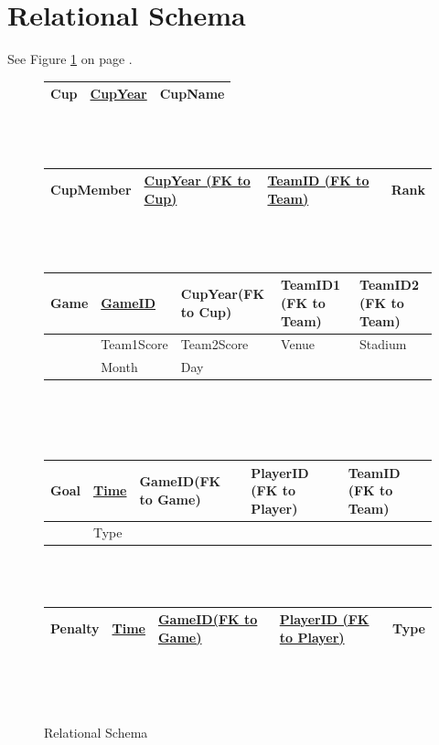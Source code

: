 \documentclass{article}
\begin{document}
\section{Relational Schema}
See Figure \ref{schematable} on page \pageref{schematable}.
\begin{figure}
	\caption{Relational Schema}
	\label{schematable}
	\begin{tabular}{||l || l | l |}
		\hline
		Cup & \textbf{\underline{CupYear}} & CupName \\
		\hline
	\end{tabular}
	\\
	\\
	\begin{tabular}{||l || l | l | l |}
		\hline
		CupMember & \textbf{\underline{CupYear (FK to Cup)}} & \textbf{\underline{TeamID (FK to Team)}} & Rank\\
		\hline
	\end{tabular}
	\\
	\\
	\begin{tabular}{||l || l | l | l |l|}
		\hline
		Game & \textbf{\underline{GameID}} & CupYear(FK to Cup) & TeamID1 (FK to Team) & TeamID2 (FK to Team)\\
		\hline
		& Team1Score & Team2Score & Venue & Stadium \\
		\hline
		& Month & Day & &\\
		\hline
	\end{tabular}
	\\
	\\
	\\
	\begin{tabular}{||l || l | l | l |l|}
		\hline
		Goal & \textbf{\underline{Time}} & GameID(FK to Game) & PlayerID (FK to Player) & TeamID (FK to Team)\\
		\hline
		& Type & & & \\
		\hline
	\end{tabular}
	\\
	\\
	\begin{tabular}{||l || l | l | l |l|}
		\hline
		Penalty & \textbf{\underline{Time}} & \textbf{\underline{GameID(FK to Game)}} & \textbf{\underline{PlayerID (FK to Player)}} & Type\\
		\hline
	\end{tabular}
	\\
	\\
	\begin{tabular}{||l || l | l |}

\end{tabular}
\end{figure}
\end{document}

